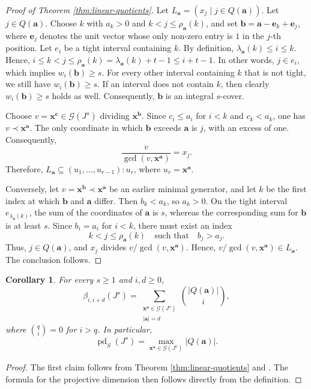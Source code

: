 \documentclass[12pt]{amsart}
\newtheorem{corollary}[theorem]{Corollary}
\theoremstyle{definition}
\theoremstyle{remark}
\numberwithin{equation}{section}
\newcommand{\avec}{\mathbf a}
\newcommand{\xvec}{\mathbf x}
\newcommand{\GG}{\mathcal G}
\DeclareMathOperator{\pd}{pd}
\begin{document}
\begin{proof}[Proof of Theorem \ref{thm:linear-quotients}]
Let $L_{\mathbf{a}} = (x_j \mid j \in Q(\mathbf{a}))$. 
Let $j \in Q(\mathbf{a})$. Choose $k$ with $a_k > 0$ and $k < j \le \rho_{\mathbf{a}}(k)$, and set $\mathbf{b} = \mathbf{a} - \mathbf{e}_k + \mathbf{e}_j$, where $\mathbf{e}_j$ denotes the unit vector whose only non-zero entry is $1$ in the $j$-th position. Let $e_i$ be a tight interval containing $k$. By definition, $\lambda_{\mathbf{a}}(k) \le i  \le k$. Hence, $i \le k < j \le \rho_{\mathbf{a}}(k) = \lambda_{\mathbf{a}}(k) + t -1 \le i+t-1$. In other words, $j \in e_i$, which implies $w_i(\mathbf{b}) \ge s$. For every other interval containing $k$ that is not tight, we still have $w_i(\mathbf{b}) \ge s$. If an interval does not contain $k$, then clearly $w_i(\mathbf{b}) \ge s$ holds as well. Consequently, $\mathbf{b}$ is an integral $s$-cover.

Choose $v = \mathbf{x}^{\mathbf{c}} \in \mathcal{G}(J^s)$ dividing $\mathbf{x}^{\mathbf{b}}$. 
Since $c_i \le a_i$ for $i < k$ and $c_k < a_k$, one has $v \prec \mathbf{x}^{\mathbf{a}}$. The only coordinate in which $\mathbf{b}$ exceeds $\mathbf{a}$ is $j$, with an excess of one. Consequently,
\[
\frac{v}{\gcd(v, \mathbf{x}^{\mathbf{a}})} = x_j.
\]
Therefore, $L_{\mathbf{a}} \subseteq (u_1, \ldots, u_{r-1}) : u_r$, where $u_r = \mathbf{x}^{\mathbf{a}}$.

Conversely, let $v = \mathbf{x}^{\mathbf{b}} \prec \mathbf{x}^{\mathbf{a}}$ be an earlier minimal generator, and let $k$ be the first index at which $\mathbf{b}$ and $\mathbf{a}$ differ. Then $b_k < a_k$, so $a_k > 0$. On the tight interval $e_{\lambda_{\mathbf{a}}(k)}$, the sum of the coordinates of $\mathbf{a}$ is $s$, whereas the corresponding sum for $\mathbf{b}$ is at least $s$. Since $b_i = a_i$ for $i < k$, there must exist an index
\[
k < j \le \rho_{\mathbf{a}}(k) \quad \text{such that} \quad b_j > a_j.
\]
Thus, $j \in Q(\mathbf{a})$, and $x_j$ divides $v / \gcd(v, \mathbf{x}^{\mathbf{a}})$. Hence, $v / \gcd(v, \mathbf{x}^{\mathbf{a}}) \in L_{\mathbf{a}}$. The conclusion follows.
\end{proof}

\begin{corollary}\label{cor:betti}
For every $s \ge 1$ and $i, d \ge 0$,
\[
\beta_{i,i+d}(J^s) = \sum_{\substack{\xvec^\avec \in \GG(J^s) \\ |\avec| = d}} \binom{|Q(\avec)|}{i},
\]
where $\binom{q}{i} = 0$ for $i > q$. In particular,
\[
\pd_S(J^s) = \max_{\xvec^\avec \in \GG(J^s)} |Q(\avec)|.
\]
\end{corollary}
\begin{proof}
The first claim follows from Theorem \ref{thm:linear-quotients} and \cite[Corollary~2.7]{SV}. The formula for the projective dimension then follows directly from the definition.
\end{proof}
\end{document}
